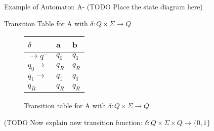 \documentclass[runningheads,a4paper]{llncs}
\begin{document}
Example of Automaton A- {\color{red}(TODO Place the state diagram here)}

Transition Table for A with $\delta: Q \times \Sigma \rightarrow Q$ 

\begin{figure}
\begin{center}

	\setlength{\tabcolsep}{4pt}
	\renewcommand{\arraystretch}{1.5}
	
	\begin{tabular}{|P{1.0cm} || P{0.6cm} | P{0.6cm} |}
	\hline
	$\delta$ & a & b \\
	\hline
	\hline
	$\rightarrow q^-$ 		& $q_0$ & $q_1$ \\
	\hline
	$q_0 \rightarrow$ 		& $q_R$ & $q_R$ \\
	\hline
	$q_1 \rightarrow$ 		& $q_1$ & $q_1$ \\
	\hline
	$q_R$  					& $q_R$ & $q_R$ \\
	\hline
	\end{tabular}

	
\caption{Transition table for A with $\delta: Q \times \Sigma \rightarrow Q$}
\end{center}
\end{figure}




 {\color{red}(TODO Now explain new transition function:} $\delta: Q \times \Sigma \times Q \rightarrow \{0,1\}$
\end{document}

